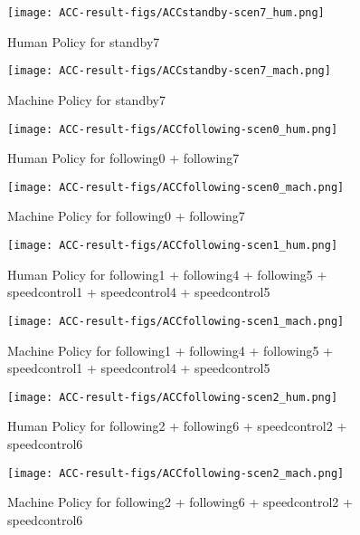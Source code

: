 \begin{figure}[h]
    \centering
    \texttt{[image: ACC-result-figs/ACCstandby-scen7\_hum.png]}
    \caption{Human Policy for standby7}
    \label{fig:standby-s7-hum}
\end{figure}

\begin{figure}[h]
    \centering
    \texttt{[image: ACC-result-figs/ACCstandby-scen7\_mach.png]}
    \caption{Machine Policy for standby7}
    \label{fig:standby-s7-mach}
\end{figure}

\begin{figure}[h]
    \centering
    \texttt{[image: ACC-result-figs/ACCfollowing-scen0\_hum.png]}
    \caption{Human Policy for following0 + following7}
    \label{fig:following-s0-hum}
\end{figure}

\begin{figure}[h]
    \centering
    \texttt{[image: ACC-result-figs/ACCfollowing-scen0\_mach.png]}
    \caption{Machine Policy for following0 + following7}
    \label{fig:following-s0-mach}
\end{figure}

\begin{figure}[h]
    \centering
    \texttt{[image: ACC-result-figs/ACCfollowing-scen1\_hum.png]}
    \caption{Human Policy for following1 + following4 + following5 + speedcontrol1 + speedcontrol4 + speedcontrol5}
    \label{fig:following-s1-hum}
\end{figure}

\begin{figure}[h]
    \centering
    \texttt{[image: ACC-result-figs/ACCfollowing-scen1\_mach.png]}
    \caption{Machine Policy for following1 + following4 + following5 + speedcontrol1 + speedcontrol4 + speedcontrol5}
    \label{fig:following-s1-mach}
\end{figure}

\begin{figure}[h]
    \centering
    \texttt{[image: ACC-result-figs/ACCfollowing-scen2\_hum.png]}
    \caption{Human Policy for following2 + following6 + speedcontrol2 + speedcontrol6}
    \label{fig:following-s2-hum}
\end{figure}

\begin{figure}[h]
    \centering
    \texttt{[image: ACC-result-figs/ACCfollowing-scen2\_mach.png]}
    \caption{Machine Policy for following2 + following6 + speedcontrol2 + speedcontrol6}
    \label{fig:following-s2-mach}
\end{figure}

